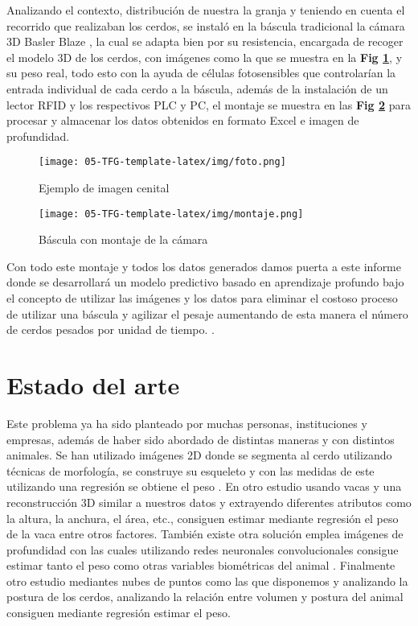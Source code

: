 ﻿\documentclass[10pt,a4paper,twocolumn,twoside]{article}
\begin{document}
Analizando el contexto, distribución de nuestra la granja y teniendo en cuenta el recorrido que realizaban los cerdos, se instaló en la báscula tradicional la cámara 3D Basler Blaze \cite{camara}, la cual se adapta bien por su resistencia, encargada de recoger el modelo 3D de los cerdos, con imágenes como la que se muestra en la \textbf{Fig \ref{foto}}, y su peso real, todo esto con la ayuda de células fotosensibles que controlarían la entrada individual de cada cerdo a la báscula, además de la instalación de un lector RFID y los respectivos PLC y PC, el montaje se muestra en las \textbf{Fig \ref{montaje}} para procesar y almacenar los datos obtenidos en formato Excel e imagen de profundidad. 

\begin{figure}[!htb]
\centering
\texttt{[image: 05-TFG-template-latex/img/foto.png]}
\caption{Ejemplo de imagen cenital}
\label{foto}
\end{figure}

\begin{figure}[!htb]
\centering
\texttt{[image: 05-TFG-template-latex/img/montaje.png]}
\caption{Báscula con montaje de la cámara}
\label{montaje}
\end{figure}

Con todo este montaje y todos los datos generados damos puerta a este informe donde se desarrollará un modelo predictivo basado en aprendizaje profundo bajo el concepto de utilizar las imágenes y los datos para eliminar el costoso proceso de utilizar una báscula y agilizar el pesaje aumentando de esta manera el número de cerdos pesados por unidad de tiempo. \cite{sistema}.

\section{Estado del arte}
Este problema ya ha sido planteado por muchas personas, instituciones y empresas, además de haber sido abordado de distintas maneras y con distintos animales. Se han utilizado imágenes 2D donde se segmenta al cerdo utilizando técnicas de morfología, se construye su esqueleto y con las medidas de este utilizando una regresión se obtiene el peso \cite{Area}. En otro estudio usando vacas y una reconstrucción 3D similar a nuestros datos y extrayendo diferentes atributos como la altura, la anchura, el área, etc., consiguen estimar mediante regresión el peso de la vaca entre otros factores\cite{3D}.
También existe otra solución emplea imágenes de profundidad con las cuales utilizando redes neuronales convolucionales consigue estimar tanto el peso como otras variables biométricas del animal \cite{CNN}.
Finalmente otro estudio mediantes nubes de puntos como las que disponemos y analizando la postura de los cerdos, analizando la relación entre volumen y postura del animal consiguen mediante regresión estimar el peso.
\end{document}
